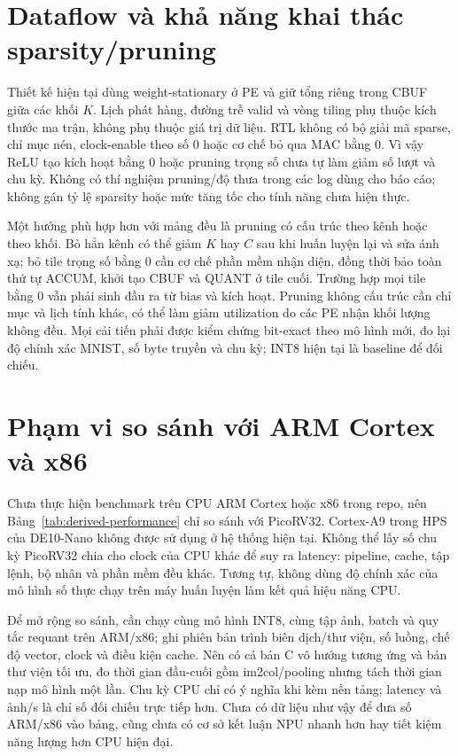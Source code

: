 \section{Dataflow và khả năng khai thác sparsity/pruning}
\label{sec:sparsity}
Thiết kế hiện tại dùng weight-stationary ở PE và giữ tổng riêng trong CBUF giữa các khối $K$. Lịch phát hàng, đường trễ valid và vòng tiling phụ thuộc kích thước ma trận, không phụ thuộc giá trị dữ liệu. RTL không có bộ giải mã sparse, chỉ mục nén, clock-enable theo số 0 hoặc cơ chế bỏ qua MAC bằng 0. Vì vậy ReLU tạo kích hoạt bằng 0 hoặc pruning trọng số chưa tự làm giảm số lượt và chu kỳ. Không có thí nghiệm pruning/độ thưa trong các log dùng cho báo cáo; không gán tỷ lệ sparsity hoặc mức tăng tốc cho tính năng chưa hiện thực.

Một hướng phù hợp hơn với mảng đều là pruning có cấu trúc theo kênh hoặc theo khối. Bỏ hẳn kênh có thể giảm $K$ hay $C$ sau khi huấn luyện lại và sửa ánh xạ; bỏ tile trọng số bằng 0 cần cơ chế phần mềm nhận diện, đồng thời bảo toàn thứ tự ACCUM, khởi tạo CBUF và QUANT ở tile cuối. Trường hợp mọi tile bằng 0 vẫn phải sinh đầu ra từ bias và kích hoạt. Pruning không cấu trúc cần chỉ mục và lịch tính khác, có thể làm giảm utilization do các PE nhận khối lượng không đều. Mọi cải tiến phải được kiểm chứng bit-exact theo mô hình mới, đo lại độ chính xác MNIST, số byte truyền và chu kỳ; INT8 hiện tại là baseline để đối chiếu.

\section{Phạm vi so sánh với ARM Cortex và x86}
\label{sec:modern-cpu}
Chưa thực hiện benchmark trên CPU ARM Cortex hoặc x86 trong repo, nên Bảng~\ref{tab:derived-performance} chỉ so sánh với PicoRV32. Cortex-A9 trong HPS của DE10-Nano không được sử dụng ở hệ thống hiện tại. Không thể lấy số chu kỳ PicoRV32 chia cho clock của CPU khác để suy ra latency: pipeline, cache, tập lệnh, bộ nhân và phần mềm đều khác. Tương tự, không dùng độ chính xác của mô hình số thực chạy trên máy huấn luyện làm kết quả hiệu năng CPU.

Để mở rộng so sánh, cần chạy cùng mô hình INT8, cùng tập ảnh, batch và quy tắc requant trên ARM/x86; ghi phiên bản trình biên dịch/thư viện, số luồng, chế độ vector, clock và điều kiện cache. Nên có cả bản C vô hướng tương ứng và bản thư viện tối ưu, đo thời gian đầu-cuối gồm im2col/pooling nhưng tách thời gian nạp mô hình một lần. Chu kỳ CPU chỉ có ý nghĩa khi kèm nền tảng; latency và ảnh/s là chỉ số đối chiếu trực tiếp hơn. Chưa có dữ liệu như vậy để đưa số ARM/x86 vào bảng, cũng chưa có cơ sở kết luận NPU nhanh hơn hay tiết kiệm năng lượng hơn CPU hiện đại.

